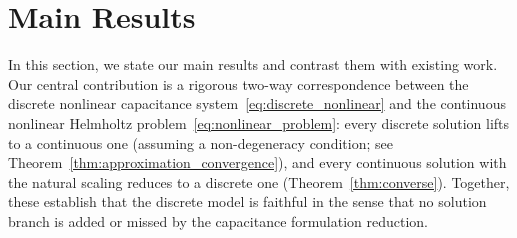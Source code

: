 \documentclass[a4paper,reqno,twoside]{amsart}
\numberwithin{equation}{section}
\theoremstyle{definition}
\newcommand{\<}{\ensuremath \leq}
\renewcommand{\>}{\ensuremath \geq}
\begin{document}



\section{Main Results}\label{sec:mainresults}

In this section, we state our main results and contrast them with existing 
work. Our central contribution is a rigorous two-way correspondence between 
the discrete nonlinear capacitance system~\eqref{eq:discrete_nonlinear} and 
the continuous nonlinear Helmholtz problem~\eqref{eq:nonlinear_problem}: 
every discrete solution lifts to a continuous one 
(assuming a non-degeneracy condition; see Theorem~\ref{thm:approximation_convergence}), and every continuous 
solution with the natural scaling reduces to a discrete one 
(Theorem~\ref{thm:converse}). Together, these establish that the discrete 
model is faithful in the sense that no solution branch is added or missed by the 
capacitance formulation reduction.
\end{document}
